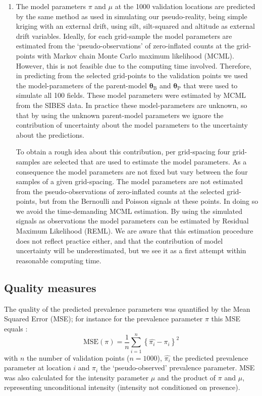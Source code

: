 \documentclass[review]{elsarticle}
\begin{document}
\begin{enumerate}
\item
The model parameters $\pi$ and $\mu$ at the 1000 validation locations are predicted by the same method as used in simulating our pseudo-reality, being simple kriging with an external drift, using silt, silt-squared and altitude as external drift variables. Ideally, for each grid-sample the model parameters are estimated from the `pseudo-observations' of zero-inflated counts at the grid-points with Markov chain Monte Carlo maximum likelihood (MCML). However, this is not feasible due to the computing time involved. Therefore, in predicting from the selected grid-points to the validation points we used the model-parameters of the parent-model $\boldsymbol{\theta}_{\mathrm{B}}$ and $\boldsymbol{\theta}_{\mathrm{P}}$ that were used to simulate all 100 fields. These model parameters were estimated by MCML from the SIBES data. In practice these model-parameters are unknown, so that by using the unknown parent-model parameters we ignore the contribution of uncertainty about the model parameters to the uncertainty about the predictions.

To obtain a rough idea about this contribution, per grid-spacing four grid-samples are selected that are used to estimate the model parameters. As a consequence the model parameters are not fixed but vary between the four samples of a given grid-spacing. The model parameters are not estimated from the pseudo-observations of zero-inflated counts at the selected grid-points, but from the Bernoulli and Poisson signals at these points. In doing so we avoid the time-demanding MCML estimation. By using the simulated signals as observations the model parameters can be estimated by Residual Maximum Likelihood (REML). We are aware that this estimation procedure does not reflect practice either, and that the contribution of model uncertainty will be underestimated, but we see it as a first attempt within reasonable computing time.
\end{enumerate}

\subsection{Quality measures}
The quality of the predicted prevalence parameters was quantified by the Mean Squared Error (MSE); for instance for the prevalence parameter $\pi$ this MSE equals :
\begin{equation}
    \text{MSE}(\pi)=\frac{1}{n}\sum_{i=1}^{n} \left\{\hat{\pi_{i}} - \pi_{i} \right\}^{2}
\label{eq:mse}
\end{equation}
with $n$ the number of validation points ($n=1000$), $\hat{\pi_{i}}$ the predicted prevalence parameter at location $i$ and $\pi_{i}$ the `pseudo-observed' prevalence parameter. 
MSE was also calculated for the intensity parameter $\mu$ and the product of $\pi$ and $\mu$, representing unconditional intensity (intensity not conditioned on presence). 
\end{document}
